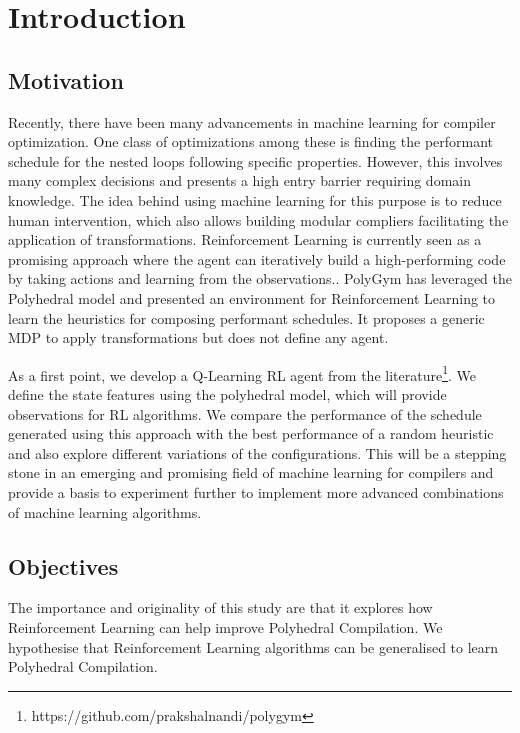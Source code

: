 \documentclass[logo,msc]{infthesis}           %
\begin{document}
\chapter{Introduction}

\section{Motivation}

Recently, there have been many advancements in machine learning for compiler optimization. One class of optimizations among these is finding the performant schedule for the nested loops following specific properties. However, this involves many complex decisions and presents a high entry barrier requiring domain knowledge. The idea behind using machine learning for this purpose is to reduce human intervention, which also allows building modular compliers facilitating the application of transformations. Reinforcement Learning is currently seen as a promising approach where the agent can iteratively build a high-performing code by taking actions and learning from the observations.\cite{8357388}\cite{9232934}. PolyGym has leveraged the Polyhedral model and presented an environment for Reinforcement Learning to learn the heuristics for composing performant schedules. It proposes a generic MDP to apply transformations but does not define any agent.

As a first point, we develop a Q-Learning RL agent from the literature\footnote{https://github.com/prakshalnandi/polygym}. We define the state features using the polyhedral model, which will provide observations for RL algorithms. We compare the performance of the schedule generated using this approach with the best performance of a random heuristic and also explore different variations of the configurations. This will be a stepping stone in an emerging and promising field of machine learning for compilers and provide a basis to experiment further to implement more advanced combinations of machine learning algorithms.



\section{Objectives}

The importance and originality of this study are that it explores how Reinforcement Learning can help improve Polyhedral Compilation.  We hypothesise that Reinforcement Learning algorithms can be generalised to learn Polyhedral Compilation.
\end{document}
